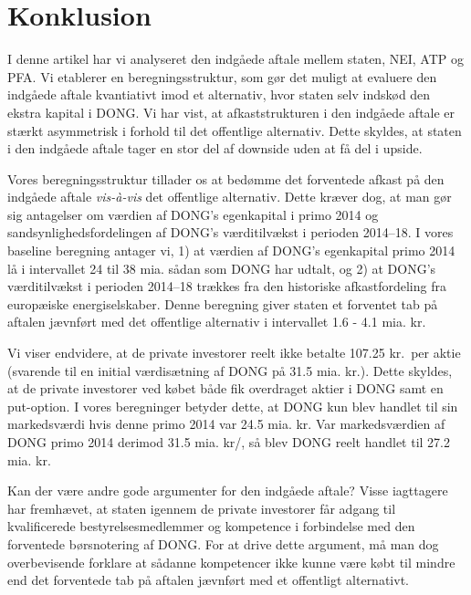 \documentclass{article}
\begin{document}

\section{Konklusion}

I denne artikel har vi analyseret den indgåede aftale mellem staten, NEI, ATP og PFA. Vi etablerer en beregningsstruktur, som gør det muligt at evaluere den indgåede aftale kvantiativt imod et alternativ, hvor staten selv indskød den ekstra kapital i DONG. Vi har vist, at afkaststrukturen i den indgåede aftale er stærkt asymmetrisk i forhold til det offentlige alternativ. Dette skyldes, at staten i den indgåede aftale tager en stor del af downside uden at få del i upside. 

Vores beregningsstruktur tillader os at bedømme det forventede afkast på den indgåede aftale \emph{vis-\`{a}-vis} det offentlige alternativ. Dette kræver dog, at man gør sig antagelser om værdien af DONG's egenkapital i primo 2014 og sandsynlighedsfordelingen af DONG's  værditilvækst i perioden 2014--18. I vores baseline beregning antager vi, 1) at værdien af DONG's egenkapital primo 2014 lå i intervallet 24 til 38 mia. sådan som DONG har udtalt, og 2) at DONG's  værditilvækst i perioden 2014--18 trækkes fra den historiske afkastfordeling fra europæiske energiselskaber. Denne beregning giver staten et forventet tab på aftalen jævnført med det offentlige alternativ i intervallet 1.6 - 4.1 mia. kr. 

Vi viser endvidere, at de private investorer reelt ikke betalte 107.25 kr.\ per aktie (svarende til en initial værdisætning af DONG på 31.5 mia. kr.). Dette skyldes, at de private investorer ved købet både fik overdraget  aktier i DONG samt en put-option. I vores beregninger betyder dette, at DONG kun blev handlet til sin markedsværdi hvis denne primo 2014 var 24.5 mia. kr. Var markedsværdien af DONG primo 2014 derimod 31.5 mia. kr/, så blev DONG reelt handlet til 27.2 mia. kr.


Kan der være andre gode argumenter for den indgåede aftale? Visse iagttagere har fremhævet, at staten igennem de private investorer får adgang til kvalificerede bestyrelsesmedlemmer og kompetence i forbindelse med den forventede børsnotering af DONG. For at drive dette argument, må man dog overbevisende forklare at sådanne kompetencer ikke kunne være købt til mindre end  det forventede tab på aftalen jævnført med et offentligt alternativt. %
\end{document}
